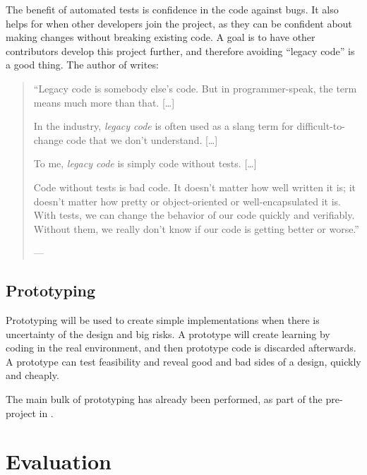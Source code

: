 The benefit of automated tests is confidence in the code against bugs.
It also helps for when other developers join the project, as they can be confident about making changes without breaking existing code.
A goal is to have other contributors develop this project further, and therefore avoiding ``legacy code'' is a good thing.
The author of  writes:

\begin{quotation}
``Legacy code is somebody else’s code. But in programmer-speak, the term means much more than that. 
[\ldots]


In the industry, \textit{legacy code} is often used as a slang term for difficult-to-change code that we don’t understand. 
[\ldots]


To me, \textit{legacy code} is simply code without tests. [\ldots]


Code without tests is bad code. It doesn’t matter how well written it is; it doesn’t matter how pretty or object-oriented or well-encapsulated it is. With tests, we can change the behavior of our code quickly and verifiably. Without them, we really don’t know if our code is getting better or worse.''


---~\textcite{feathersWorkingEffectivelyLegacy2005}
\end{quotation}


\subsection{Prototyping}

Prototyping will be used to create simple implementations when there is uncertainty of the design and big risks.
A prototype will create learning by coding in the real environment, and then prototype code is discarded afterwards.
A prototype can test feasibility and reveal good and bad sides of a design, quickly and cheaply.


The main bulk of prototyping has already been performed, as part of the pre-project in \cite{rekstadModelingEnvironmentCloud2020}.


\section{Evaluation}



